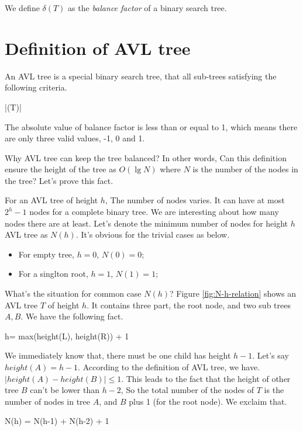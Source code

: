 \documentclass{article}
\begin{document}
We define $\delta(T)$ as the {\em balance factor} of a binary search
tree.

\section{Definition of AVL tree}

An AVL tree is a special binary search tree, that all sub-trees 
satisfying the following criteria.

\be
  |\delta(T)| 
\ee

The absolute value of balance factor is less than or equal to 1, which
means there are only three valid values, -1, 0 and 1.

Why AVL tree can keep the tree balanced? In other words, Can this definition
ensure the height of the tree as $O(\lg N)$ where $N$ is the number of
the nodes in the tree? Let's prove this fact.

For an AVL tree of height $h$, The number of nodes varies. It can have at
most $2^h-1$ nodes for a complete binary tree. We are interesting about
how many nodes there are at least. Let's denote the minimum number of nodes
for height $h$ AVL tree as $N(h)$. It's obvious for the trivial cases 
as below.

\begin{itemize}
\item For empty tree, $h=0$, $N(0)=0$;
\item For a singlton root, $h=1$, $N(1)=1$;
\end{itemize}

What's the situation for common case $N(h)$? Figure \ref{fig:N-h-relation}
shows an AVL tree $T$ of height $h$. It contains three part, the root node,
and two sub trees $A, B$. We have the following fact.

\be
  h= max(height(L), height(R)) + 1
\ee

We immediately know that, there must be one child has height $h-1$. Let's 
say $height(A) = h-1$. According to the definition of AVL tree, we have.
$|height(A)-height(B)| \leq 1$. This leads to the fact that the height of
other tree $B$ can't be lower than $h-2$, So the total number of the nodes
of $T$ is the number of nodes in tree $A$, and $B$ plus 1 (for the root node).
We exclaim that.

\be
  N(h) = N(h-1) + N(h-2) + 1
  \label{eq:Fibonacci-like}
\ee
\end{document}
